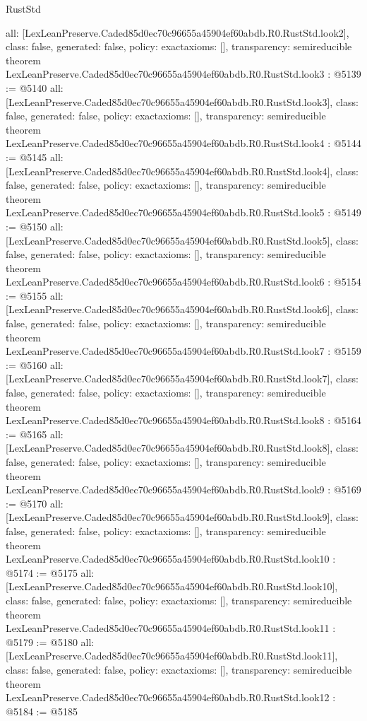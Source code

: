 \begin{lexlean}{RustStd}
\begin{coremodule}
{  all: [LexLeanPreserve.Caded85d0ec70c96655a45904ef60abdb.R0.RustStd.look2],
  class: false,
  generated: false,
  policy: exact{axioms: []},
  transparency: semireducible
}
theorem LexLeanPreserve.Caded85d0ec70c96655a45904ef60abdb.R0.RustStd.look3 : @5139 := @5140 {
  all: [LexLeanPreserve.Caded85d0ec70c96655a45904ef60abdb.R0.RustStd.look3],
  class: false,
  generated: false,
  policy: exact{axioms: []},
  transparency: semireducible
}
theorem LexLeanPreserve.Caded85d0ec70c96655a45904ef60abdb.R0.RustStd.look4 : @5144 := @5145 {
  all: [LexLeanPreserve.Caded85d0ec70c96655a45904ef60abdb.R0.RustStd.look4],
  class: false,
  generated: false,
  policy: exact{axioms: []},
  transparency: semireducible
}
theorem LexLeanPreserve.Caded85d0ec70c96655a45904ef60abdb.R0.RustStd.look5 : @5149 := @5150 {
  all: [LexLeanPreserve.Caded85d0ec70c96655a45904ef60abdb.R0.RustStd.look5],
  class: false,
  generated: false,
  policy: exact{axioms: []},
  transparency: semireducible
}
theorem LexLeanPreserve.Caded85d0ec70c96655a45904ef60abdb.R0.RustStd.look6 : @5154 := @5155 {
  all: [LexLeanPreserve.Caded85d0ec70c96655a45904ef60abdb.R0.RustStd.look6],
  class: false,
  generated: false,
  policy: exact{axioms: []},
  transparency: semireducible
}
theorem LexLeanPreserve.Caded85d0ec70c96655a45904ef60abdb.R0.RustStd.look7 : @5159 := @5160 {
  all: [LexLeanPreserve.Caded85d0ec70c96655a45904ef60abdb.R0.RustStd.look7],
  class: false,
  generated: false,
  policy: exact{axioms: []},
  transparency: semireducible
}
theorem LexLeanPreserve.Caded85d0ec70c96655a45904ef60abdb.R0.RustStd.look8 : @5164 := @5165 {
  all: [LexLeanPreserve.Caded85d0ec70c96655a45904ef60abdb.R0.RustStd.look8],
  class: false,
  generated: false,
  policy: exact{axioms: []},
  transparency: semireducible
}
theorem LexLeanPreserve.Caded85d0ec70c96655a45904ef60abdb.R0.RustStd.look9 : @5169 := @5170 {
  all: [LexLeanPreserve.Caded85d0ec70c96655a45904ef60abdb.R0.RustStd.look9],
  class: false,
  generated: false,
  policy: exact{axioms: []},
  transparency: semireducible
}
theorem LexLeanPreserve.Caded85d0ec70c96655a45904ef60abdb.R0.RustStd.look10 : @5174 := @5175 {
  all: [LexLeanPreserve.Caded85d0ec70c96655a45904ef60abdb.R0.RustStd.look10],
  class: false,
  generated: false,
  policy: exact{axioms: []},
  transparency: semireducible
}
theorem LexLeanPreserve.Caded85d0ec70c96655a45904ef60abdb.R0.RustStd.look11 : @5179 := @5180 {
  all: [LexLeanPreserve.Caded85d0ec70c96655a45904ef60abdb.R0.RustStd.look11],
  class: false,
  generated: false,
  policy: exact{axioms: []},
  transparency: semireducible
}
theorem LexLeanPreserve.Caded85d0ec70c96655a45904ef60abdb.R0.RustStd.look12 : @5184 := @5185 {
}
\end{coremodule}
\end{lexlean}
